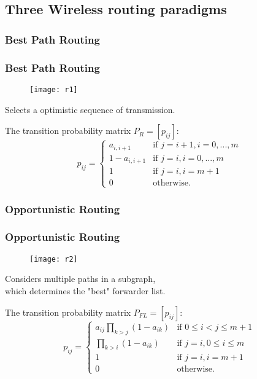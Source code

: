 \documentclass[xcolor=dvipsnames]{beamer}
\begin{document}
\subsection{Three Wireless routing paradigms}
\subsubsection{Best Path Routing}
\begin{frame}
\frametitle{Best Path Routing}
\begin{figure}
\begin{center}
  \texttt{[image: r1]}
\end{center}
\end{figure}
\begin{center}
Selects a optimistic sequence of transmission.
\end{center}
The transition probability matrix $P_{R}=[p_{ij}]$:
\begin{equation}
p_{ij} = \left\{ \begin{array}{ll}
a_{i,i+1} & \textrm{if $j=i+1,i=0,...,m$}\\
1-a_{i,i+1} & \textrm{if $j=i,i=0,...,m$}\\
1 & \textrm{if $j=i,i=m+1$}\\
0 & \textrm{otherwise.}
\end{array} \right.
\end{equation}
\end{frame}

\subsubsection{Opportunistic Routing}
\begin{frame}
\frametitle{Opportunistic Routing}
\begin{figure}
\begin{center}
  \texttt{[image: r2]}
\end{center}
\end{figure}
\begin{center}
Considers multiple paths in a subgraph,\\
which determines the "best" forwarder list.
\end{center}
The transition probability matrix $P_{FL}=[p_{ij}]$:
\begin{equation}
p_{ij} = \left\{ \begin{array}{ll}
a_{ij}\prod_{k>j}(1-a_{ik}) & \textrm{if $0\le i<j\le m+1$}\\
\prod_{k>i}(1-a_{ik}) & \textrm{if $j=i,0\le i \le m$}\\
1 & \textrm{if $j=i,i=m+1$}\\
0 & \textrm{otherwise.}
\end{array} \right.
\end{equation}
\end{frame}
\end{document}

